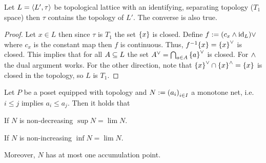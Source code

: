 \documentclass[8pt,a4paper]{article}
\begin{document}
\begin{lemma}
    Let $L=\struct{L',\tau}$ be topological lattice with an identifying, separating topology ($T_1$ space) then $\tau$ contains the  topology of $L'$. The converse is also true.
\end{lemma}

\begin{proof}
    Let $x\in L$ then since $\tau$ is $T_1$ the set $\set{x}$ is closed. Define $f:=(c_x\wedge\mathop\mathrm{id}\nolimits_L)\vee$ where $c_x$ is the constant map then $f$ is continuous. Thus, $f^{-1}{\set{x}}=\set{x}^{\join}$ is closed. This implies that for all $A\subseteq L$ the set $A^{\join}=\Setmeet_{a\in A}{\set{a}^{\join}}$ is closed. For $\wedge$ the dual argument works.
    For the other direction, note that $\set{x}^\join\setmeet\set{x}^{\meet}=\set{x}$ is closed in the  topology, so $L$ is $T_1$.
\end{proof}

\begin{lemma}
    Let $P$ be a poset equipped with  topology and $N:=\net[i\in I]{a_i}$ a monotone net, i.e. $i\leq j$ implies $a_i\leq a_j$. Then it holds that
    \begin{statements}
            \item If $N$ is non-decreasing $\sup{N}=\lim{N}$.
            \item If $N$ is non-increasing $\inf{N}=\lim{N}$.
    \end{statements}
    Moreover, $N$ has at most one accumulation point.
\end{lemma}
\end{document}
